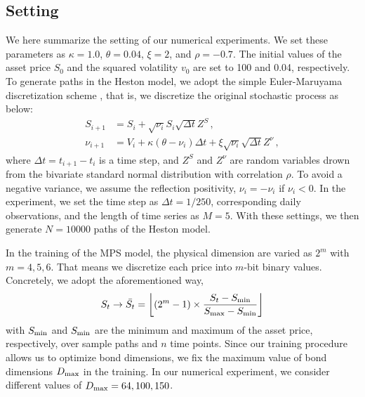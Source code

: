 {\subsection{Setting}
We here summarize the setting of our numerical experiments.
We set these parameters as $\kappa = 1.0$, $\theta = 0.04$, $\xi = 2$, and $\rho = - 0.7$.
The initial values of the asset price $S_0$ and the squared volatility $v_0$ are set to 100 and 0.04, respectively.
To generate paths in the Heston model, we adopt the simple Euler-Maruyama discretization scheme \cite{Maruyama1955}, that is, we discretize the original stochastic process as below: 
\begin{align}
S_{i+1} &= S_i + \sqrt{\nu_i} S_i \sqrt{\Delta t} Z^S  \, , \nonumber \\ 
\nu_{i+1} &= V_i + \kappa(\theta - \nu_i) \Delta t + \xi \sqrt{\nu_i} \sqrt{\Delta t} Z^\nu \, ,
\label{eq:EulerMaruyama}
\end{align}
where $\Delta t = t_{i+1} - t_{i}$ is a time step, and $Z^S$ and $Z^\nu$ are random variables drown from the bivariate  standard normal distribution with correlation $\rho$. To avoid a negative variance, we assume the reflection positivity, $\nu_i = - \nu_i$ if $\nu_i < 0$.
In the experiment, we set the time step as $\Delta t = 1/ 250$, corresponding daily observations, and the length of time series as $M=5$.
With these settings, we then generate $N=10000$ paths of the Heston model.

In the training of the MPS model, the physical dimension are varied as $2^m$ with $m=4,5,6$. 
That means we discretize each price into $m$-bit binary values.
Concretely, we adopt the aforementioned way,
\begin{align}
    S_t \rightarrow  \bar{S_t} = \left\lfloor ( 2^m - 1) \times \frac{S_t - S_{\rm min}}{S_{\rm max} - S_{\rm min}} \right\rfloor
\end{align}
with $S_{\rm min}$ and $S_{\rm min}$ are the minimum and maximum of the asset price, respectively, over sample paths and $n$ time points.
Since our training procedure allows us to optimize bond dimensions, we fix the maximum value of bond dimensions $D_{\rm max}$ in the training. 
In our numerical experiment, we consider different values of $D_{\rm max} = 64,100,150$.

}
